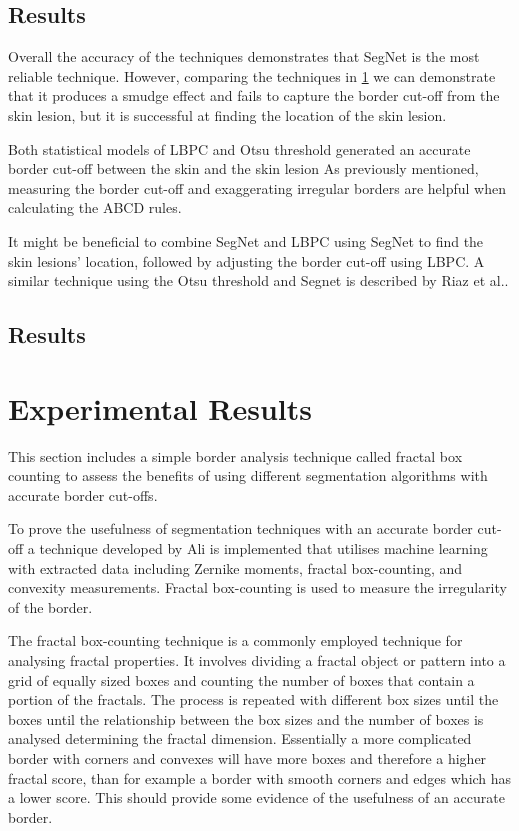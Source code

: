 \begin{figure}
    \centering
    \caption{} 
\end{figure}\label{lbpc-issues}

\subsection{Results}
Overall the accuracy of the techniques demonstrates that SegNet is the most reliable technique. However, comparing the techniques in \ref{} we can demonstrate that it produces a smudge effect and fails to capture the border cut-off from the skin lesion, but it is successful at finding the location of the skin lesion.

Both statistical models of LBPC and Otsu threshold generated an accurate border cut-off between the skin and the skin lesion As previously mentioned, measuring the border cut-off and exaggerating irregular borders are helpful when calculating the ABCD rules. 

It might be beneficial to combine SegNet and LBPC using SegNet to find the skin lesions' location, followed by adjusting the border cut-off using LBPC. A similar technique using the Otsu threshold and Segnet is described by Riaz et al.\cite{Riaz2019}.

\subsection{Results}


\section{Experimental Results}
This section includes a simple border analysis technique called fractal box counting to assess the benefits of using different segmentation algorithms with accurate border cut-offs.

To prove the usefulness of segmentation techniques with an accurate border cut-off a technique developed by Ali\cite{Ali2020b} is implemented that utilises machine learning with extracted data including Zernike moments, fractal box-counting, and convexity measurements. Fractal box-counting is used to measure the irregularity of the border.

The fractal box-counting technique is a commonly employed technique for analysing fractal properties. It involves dividing a fractal object or pattern into a grid of equally sized boxes and counting the number of boxes that contain a portion of the fractals. The process is repeated with different box sizes until the boxes until the relationship between the box sizes and the number of boxes is analysed determining the fractal dimension\cite{Hamburger1996}. Essentially a more complicated border with corners and convexes will have more boxes and therefore a higher fractal score, than for example a border with smooth corners and edges which has a lower score. This should provide some evidence of the usefulness of an accurate border.


